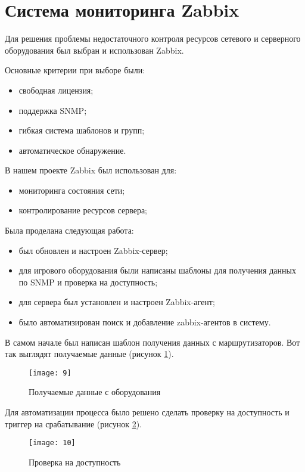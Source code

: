 \section{Система мониторинга Zabbix}

Для решения проблемы недостаточного контроля ресурсов сетевого и серверного оборудования был выбран и использован Zabbix.

Основные критерии при выборе были:
\begin{itemize}
\item свободная лицензия;
\item поддержка SNMP;
\item гибкая система шаблонов и групп;
\item автоматическое обнаружение.
\end{itemize}

В нашем проекте Zabbix был использован для:
\begin{itemize}
\item мониторинга состояния сети;
\item контролирование ресурсов сервера;
\end{itemize}

Была проделана следующая работа:
\begin{itemize}
\item был обновлен и настроен Zabbix-сервер;
\item для игрового оборудования были написаны шаблоны для получения данных по SNMP и проверка на доступность;
\item для сервера был установлен и настроен Zabbix-агент;
\item было автоматизирован поиск и добавление zabbix-агентов в систему.
\end{itemize}

В самом начале был написан шаблон получения данных с маршрутизаторов. Вот так выглядят получаемые данные (рисунок \ref{img:9}).

\begin{figure}[h!]
    \centering
    \texttt{[image: 9]}
    \caption{Получаемые данные с оборудования}
    \label{img:9}
\end{figure} 

Для автоматизации процесса было решено сделать проверку на доступность и триггер на срабатывание (рисунок \ref{img:10}).

\begin{figure}[h!]
    \centering
    \texttt{[image: 10]}
    \caption{Проверка на доступность}
    \label{img:10}
\end{figure} 


